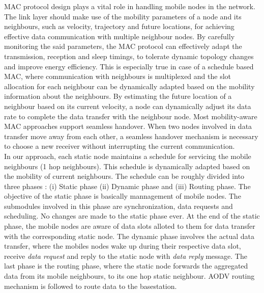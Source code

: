 \documentclass[a4paper, conference, 10pt]{IEEEtran}
\begin{document}
MAC protocol design plays a vital role in handling mobile nodes in the network. The link layer should make use of the mobility parameters of a node and its neighbours, such as velocity, trajectory and future locations, for achieving effective data communication with multiple neighbour nodes. By carefully monitoring the said parameters, the MAC protocol can effectively adapt the transmission, reception and sleep timings, to tolerate dynamic topology changes and improve energy efficiency. This is especially true in case of a schedule based MAC, where communication with neighbours is multiplexed and the slot allocation for each neighbour can be dynamically adapted based on the mobility information about the neighbours. By estimating the future location of a neighbour based on its current velocity, a node can dynamically adjust its data rate to complete the data transfer with the neighbour node. Most mobility-aware MAC approaches support seamless handover. When two nodes involved in data transfer move away from each other, a seamless handover mechanism is necessary to choose a new receiver without interrupting the current communication.\\

In our approach, each static node maintains a schedule for servicing the mobile neighbours (1 hop neighbours). This schedule is dynamically adapted based on the mobility of current neighbours. The schedule can be roughly divided into three phases : (i) Static phase (ii) Dynamic phase and (iii) Routing phase. The objective of the static phase is basically mannagement of mobile nodes. The submodules involved in this phase are synchronization, data requests and scheduling. No changes are made to the static phase ever. At the end of the static phase, the mobile nodes are aware of data slots alloted to them for data transfer with the corresponding static node. The dynamic phase involves the actual data transfer, where the mobiles nodes wake up during their respective data slot, receive \emph{data request} and reply to the static node with \emph{data reply} message. The last phase is the routing phase, where the static node forwards the aggregated data from its mobile neighbours, to its one hop static neighbour. AODV routing mechanism \cite{aodv} is followed to route data to the basestation.\\\\
\end{document}

